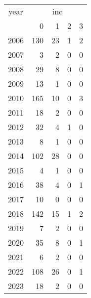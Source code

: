 \footnotesize\begin{tabular}[t]{lrrrr}
\toprule
\multicolumn{1}{c}{year} & \multicolumn{4}{c}{inc} \\
\cmidrule(l{3pt}r{3pt}){1-1} \cmidrule(l{3pt}r{3pt}){2-5}
  & 0 & 1 & 2 & 3\\
\midrule
2006 & 130 & 23 & 1 & 2\\
2007 & 3 & 2 & 0 & 0\\
2008 & 29 & 8 & 0 & 0\\
2009 & 13 & 1 & 0 & 0\\
2010 & 165 & 10 & 0 & 3\\
2011 & 18 & 2 & 0 & 0\\
2012 & 32 & 4 & 1 & 0\\
2013 & 8 & 1 & 0 & 0\\
2014 & 102 & 28 & 0 & 0\\
2015 & 4 & 1 & 0 & 0\\
2016 & 38 & 4 & 0 & 1\\
2017 & 10 & 0 & 0 & 0\\
2018 & 142 & 15 & 1 & 2\\
2019 & 7 & 2 & 0 & 0\\
2020 & 35 & 8 & 0 & 1\\
2021 & 6 & 2 & 0 & 0\\
2022 & 108 & 26 & 0 & 1\\
2023 & 18 & 2 & 0 & 0\\
\bottomrule
\end{tabular}

